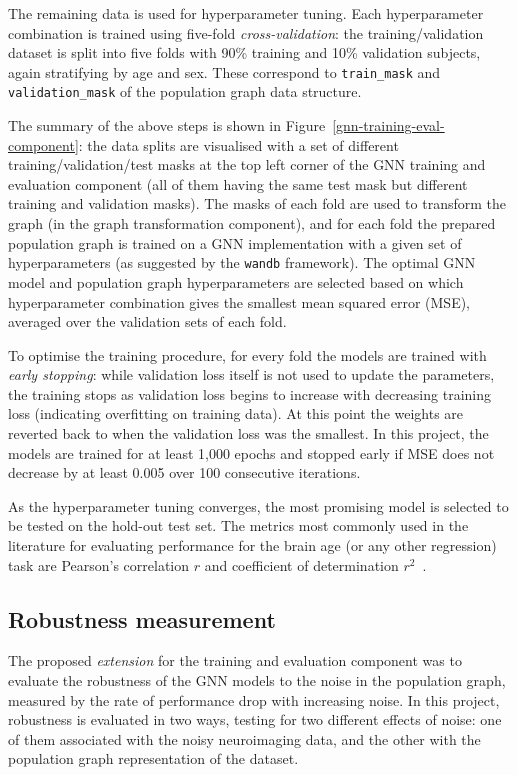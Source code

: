 The remaining data is used for hyperparameter tuning. Each hyperparameter combination is trained using five-fold \textit{cross-validation}: the training/validation dataset is split into five folds with 90\% training and 10\% validation subjects, again stratifying by age and sex. These correspond to \texttt{train\_mask} and \texttt{validation\_mask} of the population graph data structure. 

The summary of the above steps is shown in Figure~\ref{gnn-training-eval-component}: the data splits are visualised with a set of different training/validation/test masks at the top left corner of the GNN training and evaluation component (all of them having the same test mask but different training and validation masks). The masks of each fold are used to transform the graph (in the graph transformation component), and for each fold the prepared population graph is trained on a GNN implementation with a given set of hyperparameters (as suggested by the \texttt{wandb} framework). The optimal GNN model and population graph hyperparameters are selected based on which hyperparameter combination gives the smallest mean squared error (MSE), averaged over the validation sets of each fold.

To optimise the training procedure, for every fold the models are trained with \textit{early stopping}: while validation loss itself is not used to update the parameters, the training stops as validation loss begins to increase with decreasing training loss (indicating overfitting on training data). At this point the weights are reverted back to when the validation loss was the smallest. In this project, the models are trained for at least 1,000 epochs and stopped early if MSE does not decrease by at least 0.005 over 100 consecutive iterations. 

As the hyperparameter tuning converges, the most promising model is selected to be tested on the hold-out test set. The metrics most commonly used in the literature for evaluating performance for the brain age (or any other regression) task are Pearson's correlation $r$ and coefficient of determination $r^2$~\cite{pervaiz2020optimising, niu2019improved}.

\subsection{Robustness measurement}
The proposed \textit{extension} for the training and evaluation component was to evaluate the robustness of the GNN models to the noise in the population graph, measured by the rate of performance drop with increasing noise. In this project, robustness is evaluated in two ways, testing for two different effects of noise: one of them associated with the noisy neuroimaging data, and the other with the population graph representation of the dataset.


